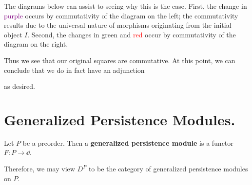 The diagrams below can assist to seeing why this is the case. First, 
the change in \textcolor{Purple}{purple} occurs by commutativity of the diagram on the left; the commutativity 
results due to the universal nature of morphisms originating from the initial object $I$. Second, 
the changes in \textcolor{OliveGreen}{green} and \textcolor{Red}{red}
occur by commutativity of the diagram on the right. 
\begin{center}
    \hspace{1cm}
\end{center}
Thus we see that our original squares are commutative. At this point, we can conclude that 
we do in fact have an adjunction 
\begin{center}
\end{center}
as desired. 

\section{Generalized Persistence Modules.}

\begin{definition}
    Let $P$ be a preorder. Then 
    a \textbf{generalized persistence module} is a functor 
    $F: P \to \dd$. 
\end{definition}
Therefore, we may view $D^P$ to be the category of generalized persistence modules 
on $P$.  

